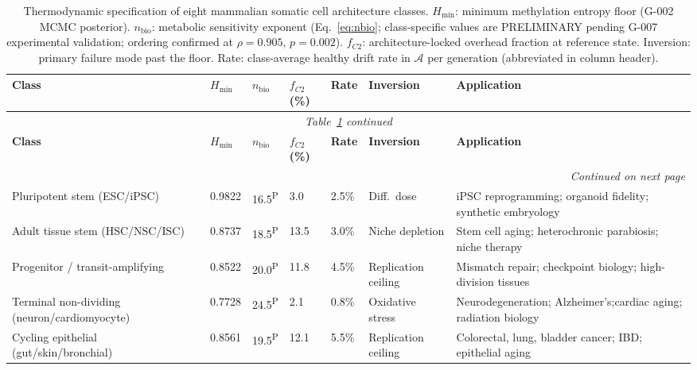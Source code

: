 \documentclass[12pt,a4paper]{article}
\newcommand{\Hmin}{H_{\min}}
\newcommand{\nbio}{n_{\mathrm{bio}}}
\newcommand{\Ascore}{\mathcal{A}}
\begin{document}
\begin{longtable}{p{3.0cm}p{1.1cm}p{1.0cm}p{1.1cm}p{1.3cm}p{2.0cm}p{4.0cm}}
\caption{Thermodynamic specification of eight mammalian somatic cell architecture
classes. $\Hmin$: minimum methylation entropy floor (G-002 MCMC posterior).
$\nbio$: metabolic sensitivity exponent (Eq.~\ref{eq:nbio}; class-specific
values are PRELIMINARY pending G-007 experimental validation; ordering
confirmed at $\rho = 0.905$, $p = 0.002$). $f_{C2}$: architecture-locked
overhead fraction at reference state. Inversion: primary failure mode past
the floor. Rate: class-average healthy drift rate in $\Ascore$ per
generation (abbreviated in column header).}
\label{tab:specsheet}\\
\toprule
\textbf{Class} & \textbf{$\Hmin$} & \textbf{$\nbio$} & \textbf{$f_{C2}$(\%)} & \textbf{Rate} & \textbf{Inversion} & \textbf{Application} \\
\midrule
\endfirsthead
\multicolumn{7}{c}{\small\itshape Table~\ref{tab:specsheet} continued}\\\toprule
\textbf{Class} & \textbf{$\Hmin$} & \textbf{$\nbio$} & \textbf{$f_{C2}$(\%)} & \textbf{Rate} & \textbf{Inversion} & \textbf{Application} \\
\midrule
\endhead
\midrule\multicolumn{7}{r}{\small\itshape Continued on next page}\\
\endfoot
\bottomrule
\endlastfoot

Pluripotent stem (ESC/iPSC) &
  0.9822 & 16.5\textsuperscript{P} & 3.0 & 2.5\% &
  Diff.\ dose &
  iPSC reprogramming; organoid fidelity; synthetic embryology\\[4pt]

Adult tissue stem (HSC/NSC/ISC) &
  0.8737 & 18.5\textsuperscript{P} & 13.5 & 3.0\% &
  Niche depletion &
  Stem cell aging; heterochronic parabiosis; niche therapy\\[4pt]

Progenitor / transit-amplifying &
  0.8522 & 20.0\textsuperscript{P} & 11.8 & 4.5\% &
  Replication ceiling &
  Mismatch repair; checkpoint biology; high-division tissues\\[4pt]

Terminal non-dividing (neuron/cardiomyocyte) &
  0.7728 & 24.5\textsuperscript{P} & 2.1 & 0.8\% &
  Oxidative stress &
  Neurodegeneration; Alzheimer's;\newline cardiac aging; radiation biology\\[4pt]

Cycling epithelial (gut/skin/bronchial) &
  0.8561 & 19.5\textsuperscript{P} & 12.1 & 5.5\% &
  Replication ceiling &
  Colorectal, lung, bladder cancer; IBD; epithelial aging\\[4pt]


\end{longtable}
\end{document}
